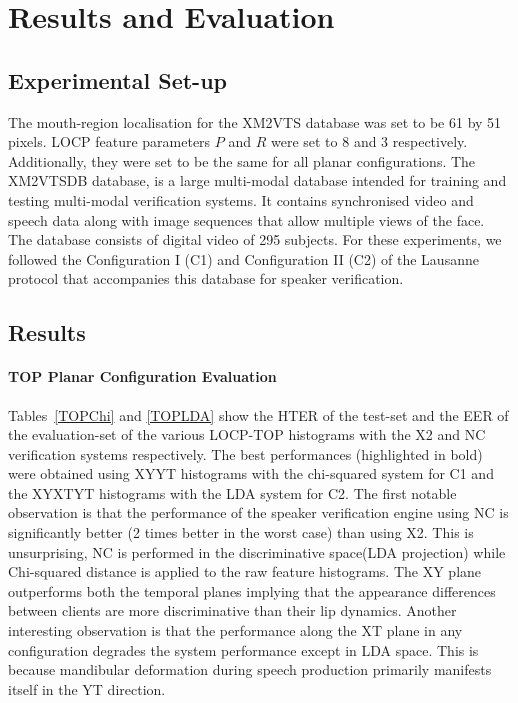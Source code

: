 \documentclass[a4paper, 10pt, conference]{ieeeconf}      %
\begin{document}
\section{Results and Evaluation}
\label{ResultsAndEvaluation}
\subsection{Experimental Set-up}
The mouth-region localisation for the XM2VTS database was set to be 61 by 51 pixels. 
LOCP feature parameters $P$ and $R$ were set to 8 and 3 respectively. 
Additionally, they were set to be the same for all planar configurations. 
The XM2VTSDB \cite{Messer99Xm2vts} database, is a large multi-modal database intended for training and testing multi-modal verification systems. 
It contains synchronised video and speech data along with image sequences that allow multiple views of the face. 
The database consists of digital video of 295 subjects. 
For these experiments, we followed the Configuration I (C1) and Configuration II (C2) of the Lausanne protocol that accompanies this database for speaker verification. 
\subsection{Results}
\paragraph*{TOP Planar Configuration Evaluation}


Tables~\ref{TOPChi} and \ref{TOPLDA} show the HTER of the test-set and the EER of the evaluation-set of the various LOCP-TOP histograms with the X2 and NC verification systems respectively. 
The best performances (highlighted in bold) were obtained using XYYT histograms with the chi-squared system for C1 and the XYXTYT histograms with the LDA system for C2. 
The first notable observation is that the performance of the speaker verification engine using NC is significantly better (2 times better in the worst case) than using X2. 
This is unsurprising, NC is performed in the discriminative space(LDA projection) while Chi-squared distance is applied to the raw feature histograms. 
The XY plane outperforms both the temporal planes implying that the appearance differences between clients are more discriminative than their lip dynamics. 
Another interesting observation is that the performance along the XT plane in any configuration degrades the system performance except in LDA space. 
This is because mandibular deformation during speech production primarily manifests itself in the YT direction. 
\end{document}

